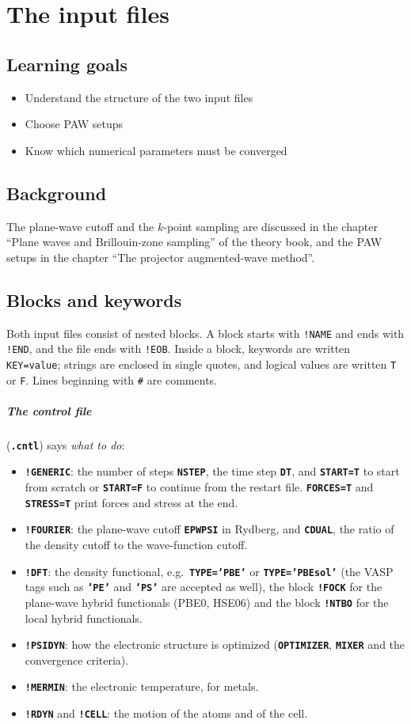 \documentclass[11pt,a4paper,oneside]{book}
\newcommand{\key}[1]{\textbf{\texttt{#1}}}
\newcommand{\file}[1]{\textbf{\texttt{#1}}}
\newcommand{\goals}{\section{Learning goals}}
\newcommand{\background}{\section{Background}}
\begin{document}
\chapter{The input files}
\minitoc

\goals
\begin{itemize}
\item Understand the structure of the two input files
\item Choose PAW setups
\item Know which numerical parameters must be converged
\end{itemize}

\background
The plane-wave cutoff and the $k$-point sampling are discussed in the
chapter ``Plane waves and Brillouin-zone sampling'' of the theory book,
and the PAW setups in the chapter ``The projector augmented-wave
method''.

\section{Blocks and keywords}

Both input files consist of nested blocks. A block starts with
\texttt{!NAME} and ends with \texttt{!END}, and the file ends with
\texttt{!EOB}. Inside a block, keywords are written
\texttt{KEY=value}; strings are enclosed in single quotes, and logical
values are written \texttt{T} or \texttt{F}. Lines beginning with
\texttt{\#} are comments.

\paragraph{The control file} (\file{.cntl}) says \emph{what to do}:
\begin{itemize}
\item \key{!GENERIC}: the number of steps \key{NSTEP}, the time step
  \key{DT}, and \key{START=T} to start from scratch or \key{START=F} to
  continue from the restart file. \key{FORCES=T} and \key{STRESS=T}
  print forces and stress at the end.
\item \key{!FOURIER}: the plane-wave cutoff \key{EPWPSI} in Rydberg,
  and \key{CDUAL}, the ratio of the density cutoff to the wave-function
  cutoff.
\item \key{!DFT}: the density functional, e.g.\ \key{TYPE='PBE'} or
  \key{TYPE='PBEsol'} (the VASP tags such as \key{'PE'} and \key{'PS'}
  are accepted as well), the block \key{!FOCK} for the plane-wave
  hybrid functionals (PBE0, HSE06) and the block \key{!NTBO} for the
  local hybrid functionals.
\item \key{!PSIDYN}: how the electronic structure is optimized
  (\key{OPTIMIZER}, \key{MIXER} and the convergence criteria).
\item \key{!MERMIN}: the electronic temperature, for metals.
\item \key{!RDYN} and \key{!CELL}: the motion of the atoms and of the
  cell.
\end{itemize}
\end{document}
